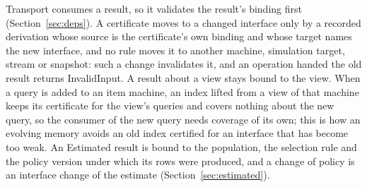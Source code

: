 \documentclass[11pt]{article}
\theoremstyle{definition}
\theoremstyle{plain}
\begin{document}
Transport consumes a result, so it validates the result's binding first (Section~\ref{sec:deps}). A
certificate moves to a changed interface only by a recorded derivation whose source is the
certificate's own binding and whose target names the new interface, and no rule moves it to another
machine, simulation target, stream or snapshot: such a change invalidates it, and an operation
handed the old result returns InvalidInput. A result about a view stays bound to the view. When a
query is added to an item machine, an index lifted from a view of that machine keeps its certificate
for the view's queries and covers nothing about the new query, so the consumer of the new query
needs coverage of its own; this is how an evolving memory avoids an old index certified for an
interface that has become too weak. An Estimated result is bound to the population, the selection
rule and the policy version under which its rows were produced, and a change of policy is an
interface change of the estimate (Section~\ref{sec:estimated}).
\end{document}
